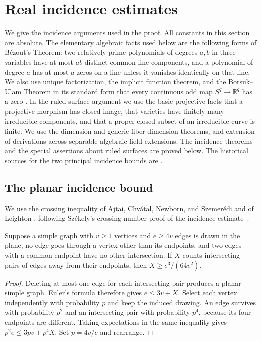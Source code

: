 \section{Real incidence estimates}
\label{ci:section}

We give the incidence arguments used in the proof.  All constants in this
section are absolute.  The elementary algebraic facts used below are the
following forms of B\'ezout's Theorem: two relatively prime polynomials of
degrees $a,b$ in three variables have at most $ab$ distinct common line
components, and a polynomial of degree $a$ has at most $a$ zeros on a line
unless it vanishes identically on that line.  We also use unique
factorization, the implicit function theorem, and the Borsuk--Ulam Theorem
in its standard form that every continuous odd map $S^q\longrightarrow
\mathbb R^q$ has a zero \cite[Corollary~2B.7]{hatcher2002}.
In the ruled-surface argument we use the basic
projective facts that a projective morphism has closed image, that
varieties have finitely many irreducible components, and that a proper
closed subset of an irreducible curve is finite.  We use the dimension
and generic-fiber-dimension theorems, and extension of derivations across
separable algebraic field extensions.  The incidence theorems and the
special assertions about ruled surfaces are proved below.
The historical sources for the two principal incidence bounds
are \cite{szemereditrotter1983,guthkatz2015}.

\subsection{The planar incidence bound}

We use the crossing inequality of Ajtai, Chv\'atal, Newborn, and
Szemer\'edi and of Leighton
\cite{ajtai1982crossing,leighton1983}, following Sz\'ekely's
crossing-number proof of the incidence estimate~\cite{szekely1997}.

\begin{lemma}[Crossings]\label{ci:crossing}
Suppose a simple graph with $v\ge1$ vertices and $e\ge4v$ edges is drawn in
the plane, no edge goes through a vertex other than its endpoints, and
two edges with a common endpoint have no other intersection.  If $X$
counts intersecting pairs of edges away from their endpoints, then
$X\ge e^3/(64v^2)$.
\end{lemma}

\begin{proof}
Deleting at most one edge for each intersecting pair produces a planar
simple graph.  Euler's formula therefore gives $e\le3v+X$.  Select each
vertex independently with probability $p$ and keep the induced drawing.
An edge survives with probability $p^2$ and an intersecting pair with
probability $p^4$, because its four endpoints are different.  Taking
expectations in the same inequality gives
$p^2e\le3pv+p^4X$.  Set $p=4v/e$ and rearrange.
\end{proof}

